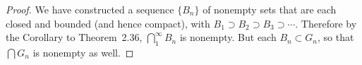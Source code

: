 \begin{proof}
  We have constructed a sequence $\{B_n\}$ of nonempty sets that are
  each closed and bounded (and hence compact), with
  $B_1\supset B_2\supset B_3\supset\cdots$. Therefore by the Corollary
  to Theorem~2.36, $\bigcap_1^\infty B_n$ is nonempty. But each
  $B_n\subset G_n$, so that $\bigcap G_n$ is nonempty as well.
\end{proof}
